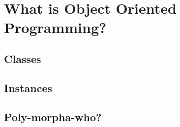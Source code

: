 \chapter{What is Object Oriented Programming?}

\section{Classes}
\section{Instances}
\section{Poly-morpha-who?}
